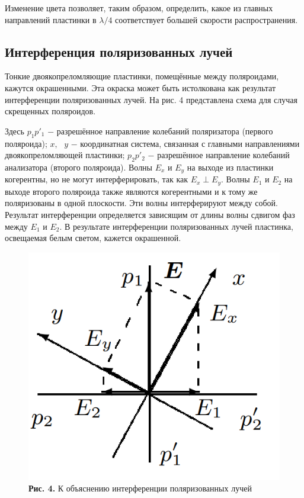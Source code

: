 \documentclass[a4paper,12pt]{article} %
\begin{document}
\hfill \break Изменение цвета позволяет, таким образом, определить, какое из главных направлений пластинки в $ \lambda/4 $ соответствует большей скорости распространения.

\subsection{Интерференция поляризованных лучей}

\hfill \break Тонкие двоякопреломляющие пластинки, помещённые между поляроидами, кажутся окрашенными. Эта окраска может быть истолкована как результат интерференции поляризованных лучей. На рис. 4 представлена схема для случая скрещенных поляроидов.

\hfill \break Здесь $ p_1p'_1 $ $-$ разрешённое направление колебаний поляризатора (первого поляроида); $ x, \text{ } y $ $-$ координатная система, связанная с главными направлениями двоякопреломляющей пластинки; $ p_2p'_2 $ $-$ разрешённое направление колебаний анализатора (второго поляроида). Волны $ E_x  $ и $ E_y $ на выходе из пластинки когерентны, но не могут интерферировать, так как $ E_x \perp  E_y $. Волны $ E_1 $ и $ E_2 $ на выходе второго поляроида также являются когерентными и к тому же поляризованы в одной плоскости. Эти волны интерферируют между собой. Результат интерференции определяется зависящим от длины волны сдвигом фаз между $ E_1 $ и $ E_2 $. В результате интерференции поляризованных лучей пластинка, освещаемая белым светом, кажется окрашенной.

\begin{figure}
\begin{center}
    \includegraphics[width=1\textwidth]{4.7.3_4.png}
    \textbf{Рис. 4.} К объяснению интерференции поляризованных лучей
\end{center}
\end{figure}
\end{document}
